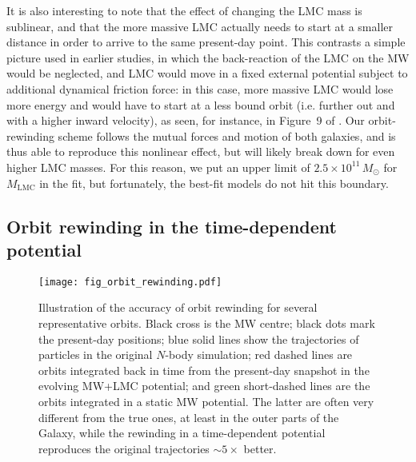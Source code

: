 \documentclass[usenatbib,fleqn]{mnras}
\begin{document}
It is also interesting to note that the effect of changing the LMC mass is sublinear, and that the more massive LMC actually needs to start at a smaller distance in order to arrive to the same present-day point. This contrasts a simple picture used in earlier studies, in which the back-reaction of the LMC on the MW would be neglected, and LMC would move in a fixed external potential subject to additional dynamical friction force: in this case, more massive LMC would lose more energy and would have to start at a less bound orbit (i.e. further out and with a higher inward velocity), as seen, for instance, in Figure~9 of \citet{Kallivayalil2013}. Our orbit-rewinding scheme follows the mutual forces and motion of both galaxies, and is thus able to reproduce this nonlinear effect, but will likely break down for even higher LMC masses. For this reason, we put an upper limit of $2.5\times10^{11}\,M_\odot$ for $M_\text{LMC}$ in the fit, but fortunately, the best-fit models do not hit this boundary.

\subsection{Orbit rewinding in the time-dependent potential}  \label{sec:test_orbit_rewinding}

\begin{figure}
\texttt{[image: fig\_orbit\_rewinding.pdf]}
\caption{Illustration of the accuracy of orbit rewinding for several representative orbits. Black cross is the MW centre; black dots mark the present-day positions; blue solid lines show the trajectories of particles in the original $N$-body simulation; red dashed lines are orbits integrated back in time from the present-day snapshot in the evolving MW+LMC potential; and green short-dashed lines are the orbits integrated in a static MW potential. The latter are often very different from the true ones, at least in the outer parts of the Galaxy, while the rewinding in a time-dependent potential reproduces the original trajectories $\sim 5\times$ better.
}  \label{fig:orbit_rewinding}
\end{figure}
\end{document}

